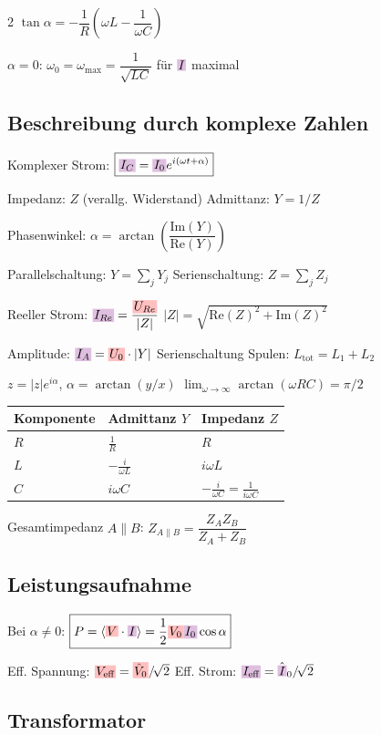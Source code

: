 \documentclass[10pt,a4paper]{article}
\newcommand{\icc}[1]{{\setlength\fboxsep{1pt}\colorbox{violet!25}{\ensuremath{#1}}}}
\newcommand{\vc}[1]{{\setlength\fboxsep{1pt}\colorbox{red!25}{\ensuremath{#1}}}}
\begin{document}
\begin{multicols}{2}
$\tan\alpha=-\dfrac{1}{R}\!\left(\omega L-\dfrac{1}{\omega C}\right)$

$\alpha=0$: $\omega_0=\omega_{\max}=\dfrac{1}{\sqrt{LC}}$ für $\icc{I}$ maximal

\subsection{Beschreibung durch komplexe Zahlen}

Komplexer Strom: $\boxed{\icc{I_C}=\icc{I_0} e^{i(\omega t+\alpha)}}$

Impedanz: $Z$ (verallg. Widerstand) \quad Admittanz: $Y=1/Z$

Phasenwinkel: $\alpha=\arctan\!\left(\dfrac{\text{Im}(Y)}{\text{Re}(Y)}\right)$

Parallelschaltung: $Y=\sum_j Y_j$ \quad Serienschaltung: $Z=\sum_j Z_j$

Reeller Strom: $\icc{I_{Re}}=\dfrac{\vc{U_{Re}}}{|Z|}$ \quad $|Z|=\sqrt{\text{Re}(Z)^2+\text{Im}(Z)^2}$

Amplitude: $\icc{I_A}=\vc{U_0}\cdot|Y|$ \quad Serienschaltung Spulen: $L_{\text{tot}}=L_1+L_2$

$z=|z|e^{i\alpha}$, $\alpha=\arctan(y/x)$ \quad $\lim_{\omega\to\infty}\arctan(\omega RC)=\pi/2$

\renewcommand{\arraystretch}{1.2}
\begin{tabularx}{\linewidth}{|X|X|X|}
\hline
Komponente & Admittanz $Y$ & Impedanz $Z$ \\
\hline
$R$ & $\frac{1}{R}$ & $R$ \\
$L$ & $-\frac{i}{\omega L}$ & $i\omega L$ \\
$C$ & $i\omega C$ & $-\frac{i}{\omega C}=\frac{1}{i\omega C}$ \\
\hline
\end{tabularx}

Gesamtimpedanz $A\|B$: $Z_{A\|B}=\dfrac{Z_A Z_B}{Z_A+Z_B}$

\subsection{Leistungsaufnahme}

Bei $\alpha\neq0$: $\boxed{P=\langle \vc{V}\cdot \icc{I}\rangle=\dfrac{1}{2}\vc{V_0} \icc{I_0}\cos\alpha}$

Eff. Spannung: $\vc{V_{\text{eff}}}=\vc{\hat{V}_0}/\!\sqrt{2}$ \quad Eff. Strom: $\icc{I_{\text{eff}}}=\hat{\icc{I}}_0/\!\sqrt{2}$

\subsection{Transformator}


\end{multicols}
\end{document}
